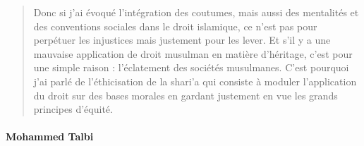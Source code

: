 \begin{quote}
Donc si j'ai évoqué l'intégration des coutumes, mais aussi des
mentalités et des conventions sociales dans le droit islamique, ce n'est
pas pour perpétuer les injustices mais justement pour les lever. Et s'il
y a une mauvaise application de droit musulman en matière d'héritage,
c'est pour une simple raison : l'éclatement des sociétés musulmanes.
C'est pourquoi j'ai parlé de l'éthicisation de la shari'a qui consiste à
moduler l'application du droit sur des bases morales en gardant
justement en vue les grands principes d'équité.


\end{quote}


\paragraph{Mohammed Talbi}
 \label{mohammed-talbi}


